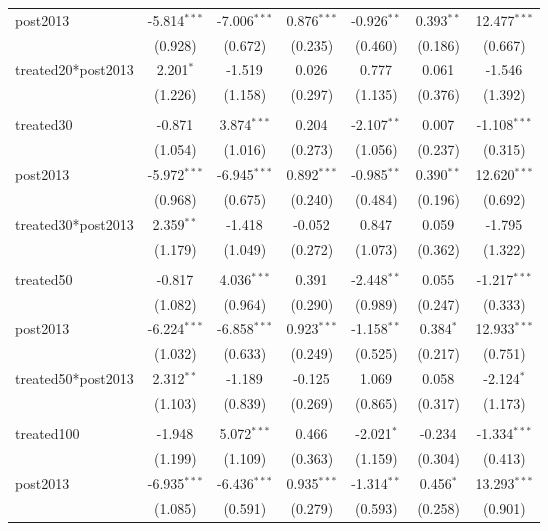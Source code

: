 \documentclass[12pt]{article}
\begin{document}
\begin{table}[!htbp]
\begin{tabular}{@{\extracolsep{5pt}}lcccccc}
 post2013 & -5.814$^{***}$ & -7.006$^{***}$ & 0.876$^{***}$ & -0.926$^{**}$ & 0.393$^{**}$ & 12.477$^{***}$ \\
  & (0.928) & (0.672) & (0.235) & (0.460) & (0.186) & (0.667) \\
 treated20*post2013 & 2.201$^{*}$ & -1.519$^{}$ & 0.026$^{}$ & 0.777$^{}$ & 0.061$^{}$ & -1.546$^{}$ \\
  & (1.226) & (1.158) & (0.297) & (1.135) & (0.376) & (1.392) \\
\hline \\[-1.8ex]
 treated30 & -0.871$^{}$ & 3.874$^{***}$ & 0.204$^{}$ & -2.107$^{**}$ & 0.007$^{}$ & -1.108$^{***}$ \\
  & (1.054) & (1.016) & (0.273) & (1.056) & (0.237) & (0.315) \\
 post2013 & -5.972$^{***}$ & -6.945$^{***}$ & 0.892$^{***}$ & -0.985$^{**}$ & 0.390$^{**}$ & 12.620$^{***}$ \\
  & (0.968) & (0.675) & (0.240) & (0.484) & (0.196) & (0.692) \\
 treated30*post2013 & 2.359$^{**}$ & -1.418$^{}$ & -0.052$^{}$ & 0.847$^{}$ & 0.059$^{}$ & -1.795$^{}$ \\
  & (1.179) & (1.049) & (0.272) & (1.073) & (0.362) & (1.322) \\
\hline \\[-1.8ex]
 treated50 & -0.817$^{}$ & 4.036$^{***}$ & 0.391$^{}$ & -2.448$^{**}$ & 0.055$^{}$ & -1.217$^{***}$ \\
  & (1.082) & (0.964) & (0.290) & (0.989) & (0.247) & (0.333) \\
 post2013 & -6.224$^{***}$ & -6.858$^{***}$ & 0.923$^{***}$ & -1.158$^{**}$ & 0.384$^{*}$ & 12.933$^{***}$ \\
  & (1.032) & (0.633) & (0.249) & (0.525) & (0.217) & (0.751) \\
 treated50*post2013 & 2.312$^{**}$ & -1.189$^{}$ & -0.125$^{}$ & 1.069$^{}$ & 0.058$^{}$ & -2.124$^{*}$ \\
  & (1.103) & (0.839) & (0.269) & (0.865) & (0.317) & (1.173) \\
\hline \\[-1.8ex]
 treated100 & -1.948$^{}$ & 5.072$^{***}$ & 0.466$^{}$ & -2.021$^{*}$ & -0.234$^{}$ & -1.334$^{***}$ \\
  & (1.199) & (1.109) & (0.363) & (1.159) & (0.304) & (0.413) \\
 post2013 & -6.935$^{***}$ & -6.436$^{***}$ & 0.935$^{***}$ & -1.314$^{**}$ & 0.456$^{*}$ & 13.293$^{***}$ \\
  & (1.085) & (0.591) & (0.279) & (0.593) & (0.258) & (0.901) \\

\end{tabular}
\end{table}
\end{document}

